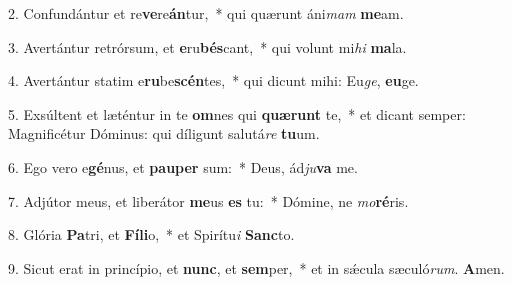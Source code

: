 2. Confundántur et re\textbf{ve}re\textbf{án}tur,~*  qui quærunt áni\textit{mam} \textbf{me}am.\

3. Avertántur retrórsum, et \textbf{e}ru\textbf{bés}cant,~*  qui volunt mi\textit{hi} \textbf{ma}la.\

4. Avertántur statim e\textbf{ru}be\textbf{scén}tes,~*  qui dicunt mihi: Eu\textit{ge}, \textbf{eu}ge.\

5. Exsúltent et læténtur in te \textbf{om}nes qui \textbf{quæ}\textbf{runt} te,~*  et dicant semper: Magnificétur Dóminus: qui díligunt salutá\textit{re} \textbf{tu}um.\

6. Ego vero e\textbf{gé}nus, et \textbf{pau}\textbf{per} sum:~*  Deus, ád\textit{ju}\textbf{va} me.\

7. Adjútor meus, et liberátor \textbf{me}us \textbf{es} tu:~*  Dómine, ne \textit{mo}\textbf{ré}ris.\

8. Glória \textbf{Pa}tri, et \textbf{Fí}\textbf{li}o,~*  et Spirítu\textit{i} \textbf{Sanc}to.\

9. Sicut erat in princípio, et \textbf{nunc}, et \textbf{sem}per,~*  et in sǽcula sæculó\textit{rum}. \textbf{A}men.\


